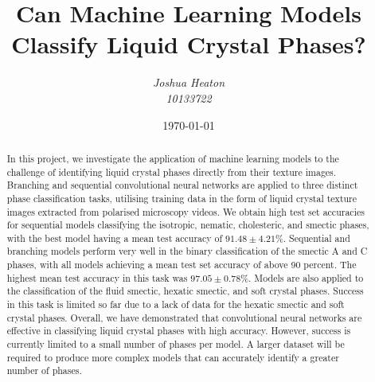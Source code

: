 \documentclass[12pt]{article}
\begin{document}
\title{Can Machine Learning Models Classify Liquid Crystal Phases?}
\author{\textit{Joshua Heaton}\\\textit{10133722}}
\date{\today}

\maketitle

\begin{abstract}
In this project, we investigate the application of machine learning models to the challenge of identifying liquid crystal phases directly from their texture images. Branching and sequential convolutional neural networks are applied to three distinct phase classification tasks, utilising training data in the form of liquid crystal texture images extracted from polarised microscopy videos. We obtain high test set accuracies for sequential models classifying the isotropic, nematic, cholesteric, and smectic phases, with the best model having a mean test accuracy of $91.48\pm4.21$\%. Sequential and branching models perform very well in the binary classification of the smectic A and C phases, with all models achieving a mean test set accuracy of above 90 percent. The highest mean test accuracy in this task was $97.05\pm0.78$\%. Models are also applied to the classification of the fluid smectic, hexatic smectic, and soft crystal phases. Success in this task is limited so far due to a lack of data for the hexatic smectic and soft crystal phases. Overall, we have demonstrated that convolutional neural networks are effective in classifying liquid crystal phases with high accuracy. However, success is currently limited to a small number of phases per model. A larger dataset will be required to produce more complex models that can accurately identify a greater number of phases.
\end{abstract}

\newpage
\tableofcontents

\newpage
{}

\end{document}
